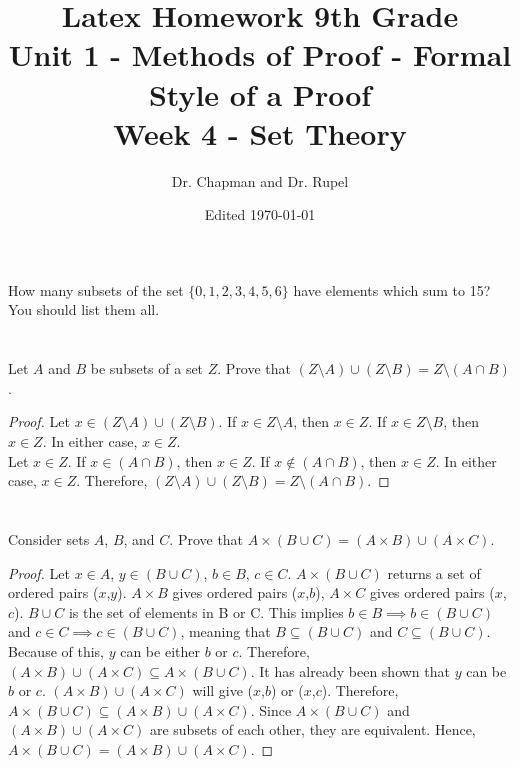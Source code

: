 \documentclass{article}
\title{Latex Homework 9th Grade\\ Unit 1 - Methods of Proof - Formal Style of a Proof\\ Week 4 - Set Theory}
\author{Dr. Chapman and Dr. Rupel}
\date{Edited \today}
\newcommand{\sm}{\setminus}
\begin{document}
\maketitle

\section{}
    How many subsets of the set \(\{0,1,2,3,4,5,6\}\) have elements which sum to 15?
    You should list them all.

\section{}
    Let $A$ and $B$ be subsets of a set $Z$.
    Prove that $(Z\sm A)\cup(Z\sm B)=Z\sm(A\cap B)$.
    \begin{proof}
     Let $x \in (Z\sm A)\cup(Z\sm B)$. If $x\in Z\sm A$, then $x\in Z$. If $x\in Z\sm B$, then $x\in Z$. In either case, $x\in Z$. \\
     Let $x \in Z$. If $x\in (A\cap B)$, then $x\in Z$. If $x\notin (A\cap B)$, then $x\in Z$. In either case, $x\in Z$. Therefore, $(Z\sm A)\cup (Z\sm B)=Z\sm (A\cap B)$.
    \end{proof}
\section{}
    Consider sets $A$, $B$, and $C$.
    Prove that $A\times(B\cup C)=(A\times B)\cup(A\times C)$.
	\begin{proof}
	Let $x\in A$, $y\in(B\cup C)$, $b\in B$, $c\in C$. $A\times(B\cup C)$ returns a set of ordered pairs ($x$,$y$). $A\times B$ gives ordered pairs ($x$,$b$), $A\times C$ gives ordered pairs ($x$, $c$). $B\cup C$ is the set of elements in B or C. This implies $b\in B \implies b\in(B\cup C)$ and $c\in C\implies c\in(B\cup C)$, meaning that $B\subseteq (B\cup C)$ and $C\subseteq (B\cup C)$. Because of this, $y$ can be either $b$ or $c$. Therefore, $(A\times B)\cup(A\times C)\subseteq A\times(B\cup C)$. It has already been shown that $y$ can be $b$ or $c$. $(A\times B)\cup(A\times C)$ will give ($x$,$b$) or ($x$,$c$). Therefore, $A\times(B\cup C)\subseteq(A\times B)\cup(A\times C)$. Since $A\times(B\cup C)$ and $(A\times B)\cup(A\times C)$ are subsets of each other, they are equivalent. Hence, $A\times(B\cup C)=(A\times B)\cup(A\times C)$. 
	\end{proof}
\end{document}
